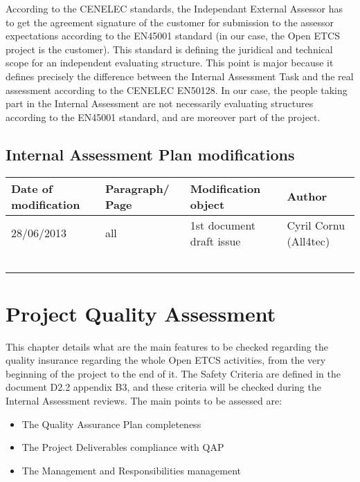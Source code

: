 \documentclass{template/openetcs_article}
\begin{document}
According to the CENELEC standards, the Independant External Assessor has to get the agreement signature of the customer for submission to the assessor expectations according to the EN45001 standard  (in our case, the Open ETCS project is the customer). This standard is defining the juridical and technical scope for an independent evaluating structure.
This point is major because it defines precisely the difference between the Internal Assessment Task and the real assessment according to the CENELEC EN50128. In our case, the people taking part in the Internal Assessment are not necessarily evaluating structures according to the EN45001 standard, and are moreover part of the project.

\newpage
\subsection{Internal Assessment Plan modifications}
\begin{tabular}{|p{2cm}|p{2cm}|p{6cm}|p{3cm}|} 
\hline
\textbf{Date of modification} & \textbf{Paragraph/ Page} & \textbf{Modification object} & \textbf{Author} \\ \hline
28/06/2013 & all & 1st document draft issue & Cyril Cornu (All4tec) \\ \hline
 & & & \\ \hline
 & & & \\ \hline
 & & & \\ \hline
 & & & \\ \hline
 & & & \\ \hline
\end{tabular}

\newpage
\section{Project Quality Assessment}
This chapter details what are the main features to be checked regarding the quality insurance regarding the whole Open ETCS activities, from the very beginning of the project to the end of it.
The Safety Criteria are defined in the document D2.2 appendix B3, and these criteria will be checked during the Internal Assessment reviews. The main points to be assessed are:
\begin{itemize}
\item The Quality Assurance Plan completeness
\item The Project Deliverables compliance with QAP
\item The Management and Responsibilities management 
\end{itemize}
\end{document}
